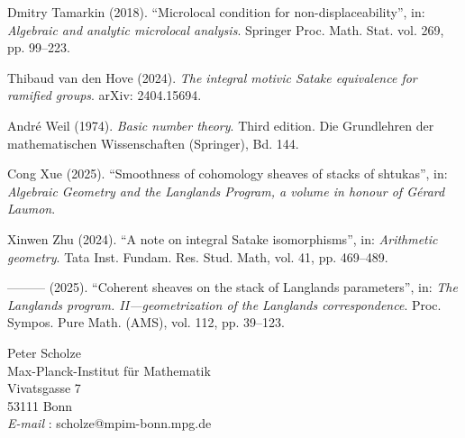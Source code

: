 \begin{list}{}{\setlength{\leftmargin}{2em}\setlength{\itemindent}{-2em}\setlength{\labelwidth}{0pt}\setlength{\labelsep}{0pt}\setlength{\itemsep}{0.3em}\setlength{\parsep}{0pt}\setlength{\topsep}{0.4em}}
\item Dmitry Tamarkin (2018). “Microlocal condition for non-displaceability”, in: \textit{Algebraic and analytic microlocal analysis}. Springer Proc. Math. Stat. vol. 269, pp. 99–223.
\item Thibaud van den Hove (2024). \textit{The integral motivic Satake equivalence for ramified groups}. arXiv: 2404.15694.
\item André Weil (1974). \textit{Basic number theory}. Third edition. Die Grundlehren der mathematischen Wissenschaften (Springer), Bd. 144.
\item Cong Xue (2025). “Smoothness of cohomology sheaves of stacks of shtukas”, in: \textit{Algebraic Geometry and the Langlands Program, a volume in honour of Gérard Laumon}.
\item Xinwen Zhu (2024). “A note on integral Satake isomorphisms”, in: \textit{Arithmetic geometry}. Tata Inst. Fundam. Res. Stud. Math, vol. 41, pp. 469–489.
\item ——— (2025). “Coherent sheaves on the stack of Langlands parameters”, in: \textit{The Langlands program. II—geometrization of the Langlands correspondence}. Proc. Sympos. Pure Math. (AMS), vol. 112, pp. 39–123.


\end{list}

\bigskip
\begin{flushright}
Peter Scholze\\
Max-Planck-Institut für Mathematik\\
Vivatsgasse 7\\
53111 Bonn\\
\textit{E-mail} : scholze@mpim-bonn.mpg.de
\end{flushright}
